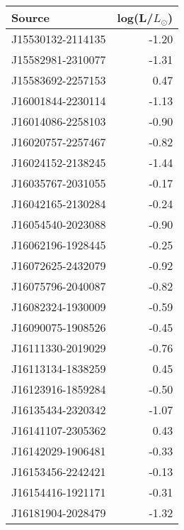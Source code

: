 \begin{tabular}{lr}
\toprule
           Source &  log(L/$L_{\odot}$) \\
\midrule
J15530132-2114135 &               -1.20 \\
J15582981-2310077 &               -1.31 \\
J15583692-2257153 &                0.47 \\
J16001844-2230114 &               -1.13 \\
J16014086-2258103 &               -0.90 \\
J16020757-2257467 &               -0.82 \\
J16024152-2138245 &               -1.44 \\
J16035767-2031055 &               -0.17 \\
J16042165-2130284 &               -0.24 \\
J16054540-2023088 &               -0.90 \\
J16062196-1928445 &               -0.25 \\
J16072625-2432079 &               -0.92 \\
J16075796-2040087 &               -0.82 \\
J16082324-1930009 &               -0.59 \\
J16090075-1908526 &               -0.45 \\
J16111330-2019029 &               -0.76 \\
J16113134-1838259 &                0.45 \\
J16123916-1859284 &               -0.50 \\
J16135434-2320342 &               -1.07 \\
J16141107-2305362 &                0.43 \\
J16142029-1906481 &               -0.33 \\
J16153456-2242421 &               -0.13 \\
J16154416-1921171 &               -0.31 \\
J16181904-2028479 &               -1.32 \\
\bottomrule
\end{tabular}
